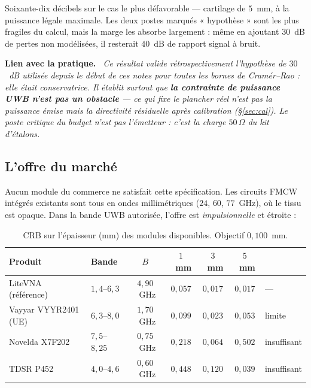 \documentclass[11pt,a4paper]{article}
\newenvironment{implication}%
  {\par\medskip\begin{lrbox}{\implbox}\begin{minipage}{0.95\textwidth}%
   \textbf{Lien avec la pratique.}\itshape\ }%
  {\end{minipage}\end{lrbox}\noindent\fbox{\usebox{\implbox}}\par\medskip}
\begin{document}
Soixante-dix décibels sur le cas le plus défavorable --- cartilage de $5$~mm, à
la puissance légale maximale. Les deux postes marqués « hypothèse » sont les
plus fragiles du calcul, mais la marge les absorbe largement : même en ajoutant
$30$~dB de pertes non modélisées, il resterait $40$~dB de rapport signal à
bruit.

\begin{implication}
Ce résultat valide rétrospectivement l'hypothèse de $30$~dB utilisée depuis le
début de ces notes pour toutes les bornes de Cramér--Rao : elle était
conservatrice. Il établit surtout que \textbf{la contrainte de puissance UWB
n'est pas un obstacle} --- ce qui fixe le plancher réel n'est pas la puissance
émise mais la directivité résiduelle après calibration (\S\ref{sec:cal}). Le
poste critique du budget n'est pas l'émetteur : c'est la charge $50\,\Omega$ du
kit d'étalons.
\end{implication}

\subsection{L'offre du marché}
\label{sec:marche}

Aucun module du commerce ne satisfait cette spécification. Les circuits FMCW
intégrés existants sont tous en ondes millimétriques ($24$, $60$, $77$~GHz), où
le tissu est opaque. Dans la bande UWB autorisée, l'offre est
\emph{impulsionnelle} et étroite :

\begin{table}[h]
\centering
\caption{CRB sur l'épaisseur (mm) des modules disponibles. Objectif
$0{,}100$~mm.}
\begin{tabular}{llccccl}
\toprule
Produit & Bande & $B$ & $1$~mm & $3$~mm & $5$~mm & \\
\midrule
LiteVNA (référence) & $1{,}4$--$6{,}3$ & $4{,}90$~GHz
  & $0{,}057$ & $0{,}017$ & $0{,}017$ & --- \\
Vayyar VYYR2401 (UE) & $6{,}3$--$8{,}0$ & $1{,}70$~GHz
  & $0{,}099$ & $0{,}023$ & $0{,}053$ & limite \\
Novelda X7F202 & $7{,}5$--$8{,}25$ & $0{,}75$~GHz
  & $0{,}218$ & $0{,}064$ & $0{,}502$ & insuffisant \\
TDSR P452 & $4{,}0$--$4{,}6$ & $0{,}60$~GHz
  & $0{,}448$ & $0{,}120$ & $0{,}039$ & insuffisant \\
\bottomrule
\end{tabular}
\end{table}
\end{document}
